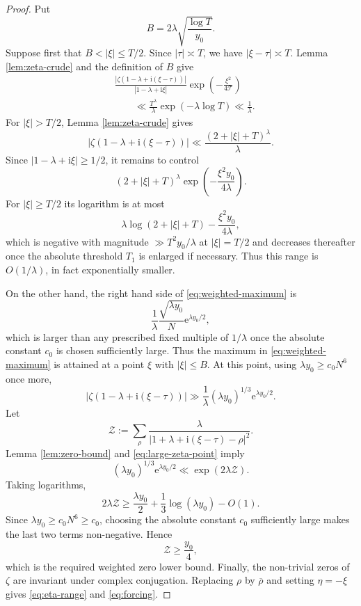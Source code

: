 \documentclass[12pt,reqno]{amsart}
\theoremstyle{remark}
\numberwithin{equation}{section}
\newcommand{\e}{\mathrm e}
\newcommand{\ii}{\mathrm i}
\begin{document}
\begin{proof}
Put
\[
B=2\lambda\sqrt{\frac{\log T}{y_0}}.
\]
Suppose first that $B<|\xi|\le T/2$.  Since $|\tau|\asymp T$, we have $|\xi-\tau|\asymp T$.  Lemma \ref{lem:zeta-crude} and the definition of $B$ give
\begin{align*}
&\frac{|\zeta(1-\lambda+\ii(\xi-\tau))|}{|1-\lambda+\ii\xi|}
\exp\!\left(-\frac{\xi^2}{4\mathcal T}\right)\\
&\qquad\ll
\frac{T^\lambda}{\lambda}
\exp(-\lambda\log T)
\ll\frac1\lambda.
\end{align*}
For $|\xi|>T/2$, Lemma \ref{lem:zeta-crude} gives
\[
|\zeta(1-\lambda+\ii(\xi-\tau))|
\ll \frac{(2+|\xi|+T)^\lambda}{\lambda}.
\]
Since $|1-\lambda+\ii\xi|\ge1/2$, it remains to control
\[
(2+|\xi|+T)^\lambda
\exp\!\left(-\frac{\xi^2y_0}{4\lambda}\right).
\]
For $|\xi|\ge T/2$ its logarithm is at most
\[
\lambda\log(2+|\xi|+T)-\frac{\xi^2y_0}{4\lambda},
\]
which is negative with magnitude $\gg T^2y_0/\lambda$ at $|\xi|=T/2$ and decreases thereafter once the absolute threshold $T_1$ is enlarged if necessary.  Thus this range is $O(1/\lambda)$, in fact exponentially smaller.

On the other hand, the right hand side of \eqref{eq:weighted-maximum} is
\[
\frac1\lambda
\frac{\sqrt{\lambda y_0}}{N}\e^{\lambda y_0/2},
\]
which is larger than any prescribed fixed multiple of $1/\lambda$ once the absolute constant $c_0$ is chosen sufficiently large.  Thus the maximum in \eqref{eq:weighted-maximum} is attained at a point $\xi$ with $|\xi|\le B$.  At this point, using $\lambda y_0\ge c_0N^6$ once more,
\begin{equation}\label{eq:large-zeta-point}
|\zeta(1-\lambda+\ii(\xi-\tau))|
\gg
\frac1\lambda(\lambda y_0)^{1/3}\e^{\lambda y_0/2}.
\end{equation}
Let
\[
\mathcal Z:=\sum_\rho
\frac{\lambda}{|1+\lambda+\ii(\xi-\tau)-\rho|^2}.
\]
Lemma \ref{lem:zero-bound} and \eqref{eq:large-zeta-point} imply
\[
(\lambda y_0)^{1/3}\e^{\lambda y_0/2}
\ll \exp(2\lambda\mathcal Z).
\]
Taking logarithms,
\[
2\lambda\mathcal Z
\ge \frac{\lambda y_0}{2}
+\frac13\log(\lambda y_0)-O(1).
\]
Since $\lambda y_0\ge c_0N^6\ge c_0$, choosing the absolute constant $c_0$ sufficiently large makes the last two terms non-negative.  Hence
\[
\mathcal Z\ge\frac{y_0}{4},
\]
which is the required weighted zero lower bound.  Finally, the non-trivial zeros of $\zeta$ are invariant under complex conjugation.  Replacing $\rho$ by $\overline\rho$ and setting $\eta=-\xi$ gives \eqref{eq:eta-range} and \eqref{eq:forcing}.
\end{proof}
\end{document}
